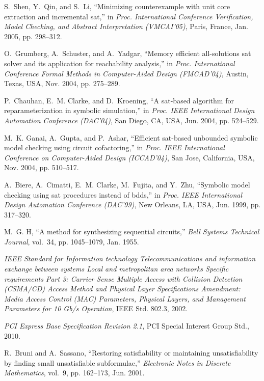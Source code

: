\documentclass[journal]{IEEEtran}
\begin{document}
\begin{thebibliography}{49}
S.~Shen, Y.~Qin, and S.~Li, ``Minimizing counterexample with unit core
  extraction and incremental sat,'' in \emph{Proc. International Conference
  Verification, Model Checking, and Abstract Interpretation ({VMCAI}'05)},
  Paris, France, Jan. 2005, pp. 298--312.

O.~Grumberg, A.~Schuster, and A.~Yadgar, ``Memory efficient all-solutions sat
  solver and its application for reachability analysis,'' in \emph{Proc.
  International Conference Formal Methods in Computer-Aided Design
  ({FMCAD}'04)}, Austin, Texas, USA, Nov. 2004, pp. 275--289.

P.~Chauhan, E.~M. Clarke, and D.~Kroening, ``A sat-based algorithm for
  reparameterization in symbolic simulation,'' in \emph{Proc. {IEEE}
  International Design Automation Conference ({DAC}'04)}, San Diego, CA, USA,
  Jun. 2004, pp. 524--529.

M.~K. Ganai, A.~Gupta, and P.~Ashar, ``Efficient sat-based unbounded symbolic
  model checking using circuit cofactoring,'' in \emph{Proc. {IEEE}
  International Conference on Computer-Aided Design ({ICCAD}'04)}, San Jose,
  California, USA, Nov. 2004, pp. 510--517.

A.~Biere, A.~Cimatti, E.~M. Clarke, M.~Fujita, and Y.~Zhu, ``Symbolic model
  checking using sat procedures instead of bdds,'' in \emph{Proc. {IEEE}
  International Design Automation Conference ({DAC}'99)}, New Orleans, LA, USA,
  Jun. 1999, pp. 317--320.

M.~G. H, ``A method for synthesizing sequential circuits,'' \emph{Bell Systems
  Technical Journal}, vol.~34, pp. 1045--1079, Jan. 1955.

\emph{IEEE Standard for Information technology Telecommunications and
  information exchange between systems Local and metropolitan area networks
  Specific requirements Part 3: Carrier Sense Multiple Access with Collision
  Detection (CSMA/CD) Access Method and Physical Layer Specifications
  Amendment: Media Access Control (MAC) Parameters, Physical Layers, and
  Management Parameters for 10 Gb/s Operation}, IEEE Std. 802.3, 2002.

\emph{PCI Express Base Specification Revision 2.1}, PCI Special Interest Group
  Std., 2010.

R.~Bruni and A.~Sassano, ``Restoring satisfiability or maintaining
  unsatisfiability by finding small unsatisfiable subformulae,''
  \emph{Electronic Notes in Discrete Mathematics}, vol.~9, pp. 162--173, Jun.
  2001.


\end{thebibliography}
\end{document}
